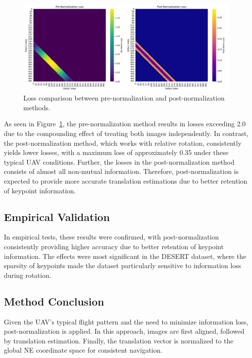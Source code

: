 \begin{figure}[H]
    \centering
    \includegraphics[width=\textwidth]{Chapter 4/Figs4/lossprevspost.png}
    \caption{Loss comparison between pre-normalization and post-normalization methods.}
    \label{fig:lossprevpost}
\end{figure}


As seen in Figure~\ref{fig:lossprevpost}, the pre-normalization method results in losses exceeding 2.0 due to the compounding effect of treating both images independently. In contrast, the post-normalization method, which works with relative rotation, consistently yields lower losses, with a maximum loss of approximately 0.35 under these typical UAV conditions. Further, the losses in the post-normalization method consists of almost all non-mutual information. Therefore, post-normalization is expected to provide more accurate translation estimations due to better retention of keypoint information.


\subsection{Empirical Validation}

In empirical tests, these results were confirmed, with post-normalization consistently providing higher accuracy due to better retention of keypoint information. The effects were most significant in the DESERT dataset, where the sparsity of keypoints made the dataset particularly sensitive to information loss during rotation. 

\subsection{Method Conclusion}

Given the UAV's typical flight pattern and the need to minimize information loss, post-normalization is applied. In this approach, images are first aligned, followed by translation estimation. Finally, the translation vector is normalized to the global NE coordinate space for consistent navigation.




